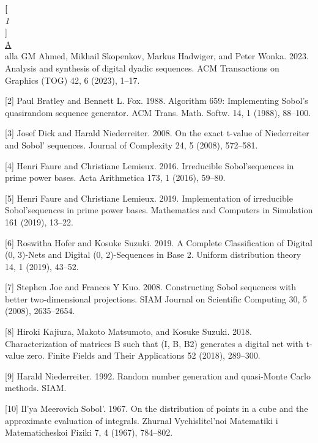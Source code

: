 \documentclass[12pt,a4paper,figuresright]{book}
\newenvironment{talk}[6]%
 {%
  \vskip 0pt\nopagebreak%
 \vskip 0pt\nopagebreak%
  \textbf{#1}\vspace{3mm}\\\nopagebreak%
  \textit{#2}\\\nopagebreak%
  #3\\\nopagebreak%
  \url{#4}\vspace{3mm}\\\nopagebreak%
  \ifthenelse{\equal{#5}{}}{}{Coauthor(s): #5\vspace{3mm}\\\nopagebreak}%
  \ifthenelse{\equal{#6}{}}{}{Special session: #6\quad \vspace{3mm}\\\nopagebreak}%
 }
 {\vspace{1cm}\\\nopagebreak}%
\begin{document}
\begin{talk}
[1] Abdalla GM Ahmed, Mikhail Skopenkov, Markus Hadwiger, and Peter Wonka. 2023. Analysis and synthesis of digital dyadic sequences. ACM Transactions on Graphics (TOG) 42, 6 (2023), 1–17.

[2] Paul Bratley and Bennett L. Fox. 1988. Algorithm 659: Implementing Sobol’s quasirandom sequence generator. ACM Trans. Math. Softw. 14, 1 (1988), 88–100.

[3] Josef Dick and Harald Niederreiter. 2008. On the exact t-value of Niederreiter and Sobol’ sequences. Journal of Complexity 24, 5 (2008), 572–581.

[4] Henri Faure and Christiane Lemieux. 2016. Irreducible Sobol’sequences in prime power bases. Acta Arithmetica 173, 1 (2016), 59–80.

[5] Henri Faure and Christiane Lemieux. 2019. Implementation of irreducible Sobol’sequences in prime power bases. Mathematics and Computers in Simulation 161 (2019), 13–22.

[6] Roswitha Hofer and Kosuke Suzuki. 2019. A Complete Classification of Digital (0, 3)-Nets and Digital (0, 2)-Sequences in Base 2. Uniform distribution theory 14, 1 (2019), 43–52.

[7] Stephen Joe and Frances Y Kuo. 2008. Constructing Sobol sequences with better two-dimensional projections. SIAM Journal on Scientific Computing 30, 5 (2008), 2635–2654.

[8] Hiroki Kajiura, Makoto Matsumoto, and Kosuke Suzuki. 2018. Characterization of matrices B such that (I, B, B2) generates a digital net with t-value zero. Finite Fields and Their
Applications 52 (2018), 289–300.

[9] Harald Niederreiter. 1992. Random number generation and quasi-Monte Carlo methods. SIAM.

[10] Il’ya Meerovich Sobol’. 1967. On the distribution of points in a cube and the approximate evaluation of integrals. Zhurnal Vychislitel’noi Matematiki i Matematicheskoi Fiziki 7, 4 (1967), 784–802.
\end{talk}
\end{document}
